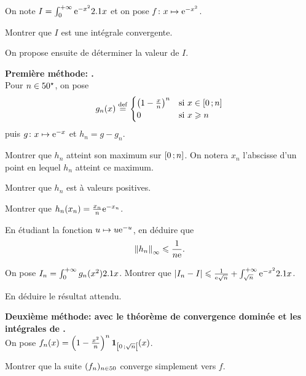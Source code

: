 \begin{exercice}
On note $I = \int_0^{+\infty} \e^{-x^2} \d x$ et on pose $\fonctionligne[f]{x}{\e^{-x^2}}$.

\begin{questions}
\item Montrer que $I$ est une intégrale convergente.
\end{questions}
On propose ensuite de déterminer la valeur de $I$.
\begin{questions}[resume]
\item \textbf{Première méthode: .} \\ 
Pour $n \in \Ne$, on pose
$$
g_n(x) \defeq
\begin{cases}
\left(1 - \frac{x}{n} \right)^n &\text{si } x \in \interff{0}{n} \\
0 &\text{si } x \geqslant n
\end{cases}
$$
puis $\fonctionligne[g]{x}{\e^{-x}}$ et $h_n = g - g_n$.

\begin{questions}
\item Montrer que $h_n$ atteint son maximum sur $\interff{0}{n}$. On notera $x_n$ l'abscisse d'un point en lequel $h_n$ atteint ce maximum.

\item Montrer que $h_n$ est à valeurs positives.

\item Montrer que $h_n(x_n) = \frac{x_n}{n} \e^{-x_n}$.

\item En étudiant la fonction $u \mapsto u \e^{-u}$, en déduire que
\[
\norm{h_n}_\infty \leqslant \frac{1}{n \e}.
\]

\item On pose $I_n= \int_0^{+\infty} g_n(x^2) \d x$. Montrer que $\module{I_n - I} \leqslant \frac{1}{\e \sqrt{n}} + \int_{\sqrt{n}}^{+\infty} \e^{-x^2} \d x$.

\item En déduire le résultat attendu.
\end{questions}

\item \textbf{Deuxième méthode: avec le théorème de convergence dominée et les intégrales de .} \\
On pose $f_n(x) = \left(1 - \frac{x^2}{n}\right)^n \indicatrice{\interfo{0}{\sqrt{n}}}(x)$.
\begin{questions}
\item Montrer que la suite $(f_n)_{n\in\N}$ converge simplement vers $f$.


\end{questions}
\end{questions}
\end{exercice}
